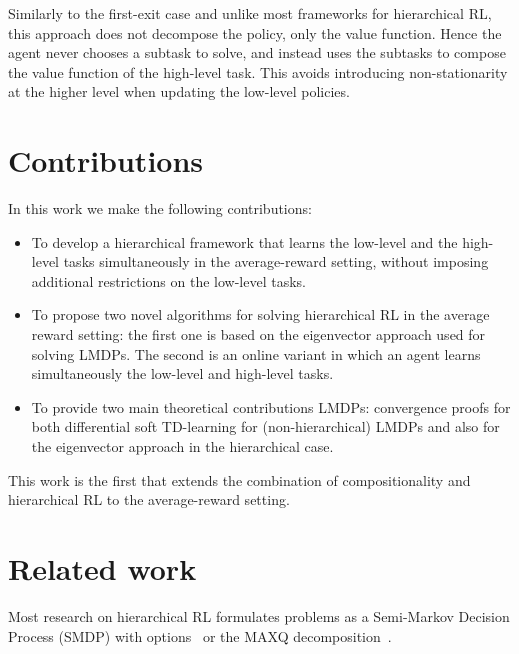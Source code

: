 Similarly to the first-exit case and unlike most frameworks for hierarchical RL, this approach does not decompose the policy, only the value function. Hence the agent never chooses a subtask to solve, and instead uses the subtasks to compose the value function of the high-level task. 
This avoids introducing non-stationarity at the higher level when updating the low-level policies.

\section{Contributions}
In this work we make the following contributions:
\begin{itemize}
  \item To develop a hierarchical framework that learns the low-level and  the high-level tasks simultaneously in the average-reward setting, without imposing additional restrictions on the low-level tasks.
    \item To propose two novel algorithms for solving hierarchical RL in the average reward setting: the first one is based on the eigenvector approach used for solving LMDPs. The second is an online variant in which an agent learns simultaneously the low-level and high-level tasks.
    \item To provide two main theoretical contributions LMDPs: convergence proofs for both differential soft TD-learning for (non-hierarchical) LMDPs and also for the eigenvector approach in the hierarchical case.
\end{itemize}

This work is the first that extends the combination of compositionality and hierarchical RL to the average-reward setting.

\section{Related work}
Most research on hierarchical RL formulates problems as a Semi-Markov Decision Process (SMDP) with options~\citep{Sutton1999} or the MAXQ decomposition~\citep{Dietterich2000}.

